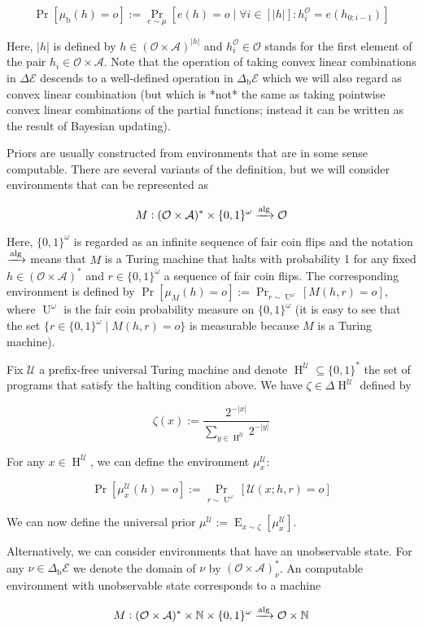 \documentclass[a4paper]{article}
\newcommand{\Bool}{\{0,1\}}
\newcommand{\Words}{{\Bool^*}}
\newcommand{\Sagas}{{\Bool^\omega}}
\DeclareMathOperator{\Prb}{Pr}
\DeclareMathOperator{\E}{E}
\DeclareMathOperator{\Un}{U}
\newcommand{\Nats}{\mathbb{N}}
\newcommand{\Abs}[1]{\lvert #1 \rvert}
\newcommand{\Alg}{\xrightarrow{\textnormal{alg}}}
\newcommand{\UTM}{\mathcal{U}}
\newcommand{\SP}[1]{\Delta #1}
\newcommand{\Act}{\mathcal{A}}
\newcommand{\Per}{\mathcal{O}}
\newcommand{\His}{(\Per \times \Act)^*}
\newcommand{\Env}{\mathcal{E}}
\newcommand{\Beh}{\Delta_{\operatorname{b}}}
\newcommand{\EnvB}{\Beh\Env}
\newcommand{\Prog}{\operatorname{H}^\UTM}
\begin{document}
$$\Prb[\mu_{\operatorname{b}}(h)=o]:=\Prb_{e \sim \mu}[e(h) = o \mid \forall i \in [\Abs{h}]: h^\Per_{i} = e(h_{0:i-1})]$$

Here, ${\Abs{h}}$ is defined by ${h \in (\Per \times \Act)^{\Abs{h}}}$ and ${h^\Per_{i} \in \Per}$ stands for the first element of the pair ${h_i \in \Per \times \Act}$. Note that the operation of taking convex linear combinations in ${\SP{\Env}}$ descends to a well-defined operation in ${\EnvB}$ which we will also regard as convex linear combination (but which is *not* the same as taking pointwise convex linear combinations of the partial functions; instead it can be written as the result of Bayesian updating). 

Priors are usually constructed from environments that are in some sense computable. There are several variants of the definition, but we will consider environments that can be represented as

$${M: \His \times \Sagas \Alg \Per}$$

Here, ${\Sagas}$ is regarded as an infinite sequence of fair coin flips and the notation ${\Alg}$ means that ${M}$ is a Turing machine that halts with probability 1 for any fixed ${h \in \His}$ and ${r \in \Sagas}$ a sequence of fair coin flips. The corresponding environment is defined by ${\Prb[\mu_M(h)=o]:=\Prb_{r \sim \Un^\omega}[M(h,r)=o]}$, where ${\Un^\omega}$ is the fair coin probability measure on ${\Sagas}$ (it is easy to see that the set ${\{r \in \Sagas \mid M(h,r)=o\}}$ is measurable because ${M}$ is a Turing machine). 

Fix ${\UTM}$ a prefix-free universal Turing machine and denote ${\Prog \subseteq \Words}$ the set of programs that satisfy the halting condition above. We have ${\zeta \in \SP{\Prog}}$ defined by

$${\zeta(x):=\frac{2^{-\Abs{x}}}{\sum_{y \in \Prog} 2^{-\Abs{y}}}}$$

For any ${x \in \Prog}$, we can define the environment ${\mu_x^\UTM}$: 

$$\Pr[\mu_x^\UTM(h)=o]:=\Prb_{r \sim \Un^\omega}[\UTM(x;h,r)=o]$$ 

We can now define the universal prior ${\mu^\UTM:=\E_{x \sim \zeta}[\mu_x^\UTM]}$.

Alternatively, we can consider environments that have an unobservable state. For any ${\nu \in \EnvB}$ we denote the domain of ${\nu}$ by ${\His_\nu}$. An computable environment with unobservable state corresponds to a machine

$${M: \His \times \Nats \times \Sagas \Alg \Per \times \Nats}$$ 
\end{document}
